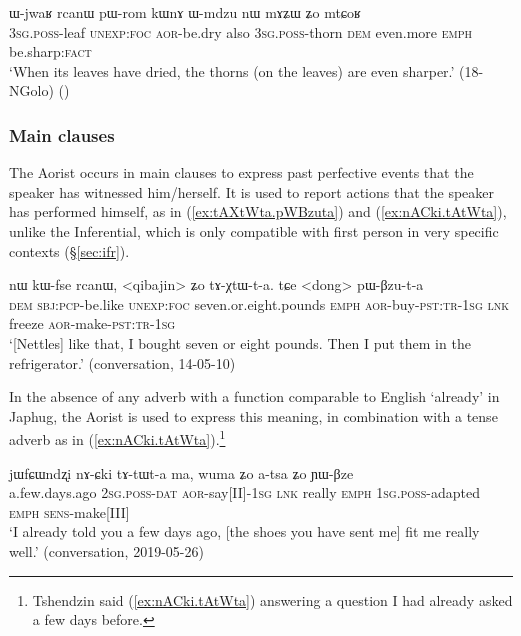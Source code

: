 \begin{exe}
\ex \label{ex:pWrom.kWnA}
 \gll  ɯ-jwaʁ rcanɯ pɯ-rom kɯnɤ ɯ-mdzu nɯ mɤʑɯ ʑo mtɕoʁ \\
\textsc{3sg}.\textsc{poss}-leaf \textsc{unexp}:\textsc{foc} \textsc{aor}-be.dry also \textsc{3sg}.\textsc{poss}-thorn \textsc{dem} even.more \textsc{emph} be.sharp:\textsc{fact} \\
\glt `When its leaves have dried, the thorns (on the leaves) are even sharper.' (18-NGolo)
()
\end{exe}

\subsubsection{Main clauses}   \label{sec:aor.main}
The Aorist occurs in main clauses to express past perfective events that the speaker has witnessed him/herself. It is used to report actions that the speaker has performed himself, as in (\ref{ex:tAXtWta.pWBzuta}) and (\ref{ex:nACki.tAtWta}), unlike the Inferential, which is only compatible with first person in very specific contexts (§\ref{sec:ifr}).

\begin{exe}
\ex \label{ex:tAXtWta.pWBzuta}
 \gll nɯ kɯ-fse rcanɯ, <qibajin> ʑo tɤ-χtɯ-t-a. tɕe <dong> pɯ-βzu-t-a  \\
\textsc{dem} \textsc{sbj}:\textsc{pcp}-be.like \textsc{unexp}:\textsc{foc} seven.or.eight.pounds \textsc{emph} \textsc{aor}-buy-\textsc{pst}:\textsc{tr}-\textsc{1sg} \textsc{lnk} freeze \textsc{aor}-make-\textsc{pst}:\textsc{tr}-\textsc{1sg} \\
\glt `[Nettles] like that, I bought seven or eight pounds. Then I put them in the refrigerator.' (conversation, 14-05-10)
\end{exe}

In the absence of any adverb with a function comparable to English `already' in Japhug, the Aorist is used to express this meaning, in combination with a tense adverb as in (\ref{ex:nACki.tAtWta}).\footnote{Tshendzin said (\ref{ex:nACki.tAtWta}) answering a question I had already asked a few days before. }

\begin{exe}
\ex \label{ex:nACki.tAtWta}
 \gll jɯfɕɯndʐi nɤ-ɕki tɤ-tɯt-a ma, wuma ʑo a-tsa ʑo ɲɯ-βze  \\
 a.few.days.ago \textsc{2sg}.\textsc{poss}-\textsc{dat} \textsc{aor}-say[II]-\textsc{1sg} \textsc{lnk} really \textsc{emph} \textsc{1sg}.\textsc{poss}-adapted \textsc{emph} \textsc{sens}-make[III] \\
 \glt `I already told you a few days ago, [the shoes you have sent me] fit me really well.' (conversation, 2019-05-26)
\end{exe}

